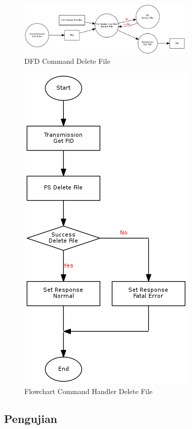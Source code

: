 \begin{figure}[h]
\centering
\includegraphics[width=0.75\textwidth]{image/command/dfd_cmddelete.png}
\caption{DFD Command Delete File}
\label{fig-dfd-cmddelete}
\end{figure}

\begin{figure}[h]
\centering
\includegraphics[height=0.6\textheight]{image/command/flow_cmddelete.png}
\caption{Flowchart Command Handler Delete File}
\label{fig-flow-cmddelete}
\end{figure}

\subsection {Pengujian}

